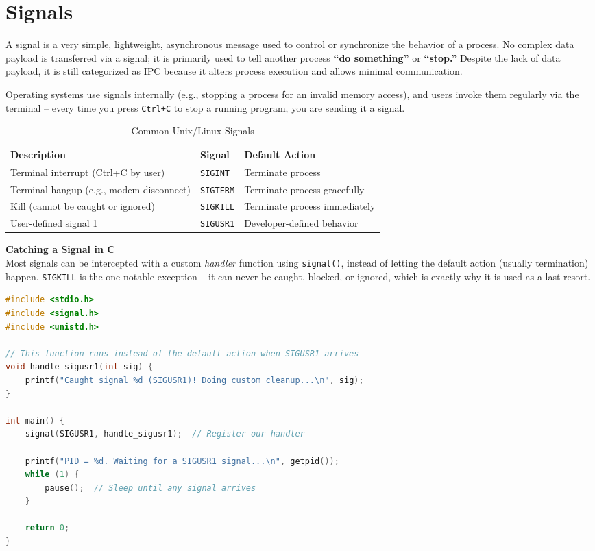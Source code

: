 \section{Signals}
A signal is a very simple, lightweight, asynchronous message used to control or synchronize the behavior of a process. No complex data payload is transferred via a signal; it is primarily used to tell another process \textbf{``do something''} or \textbf{``stop.''} Despite the lack of data payload, it is still categorized as IPC because it alters process execution and allows minimal communication.

Operating systems use signals internally (e.g., stopping a process for an invalid memory access), and users invoke them regularly via the terminal -- every time you press \texttt{Ctrl+C} to stop a running program, you are sending it a signal.

\begin{table}[h!]
\centering
\small
\renewcommand{\arraystretch}{1.4}
\begin{tabular}{|p{6cm}|p{2.5cm}|p{5.5cm}|}
\hline
\textbf{Description} & \textbf{Signal} & \textbf{Default Action} \\ \hline
Terminal interrupt (Ctrl+C by user) & \texttt{SIGINT} & Terminate process \\ \hline
Terminal hangup (e.g., modem disconnect) & \texttt{SIGTERM} & Terminate process gracefully \\ \hline
Kill (cannot be caught or ignored) & \texttt{SIGKILL} & Terminate process immediately \\ \hline
User-defined signal 1 & \texttt{SIGUSR1} & Developer-defined behavior \\ \hline
\end{tabular}
\caption{Common Unix/Linux Signals}
\end{table}

\textbf{Catching a Signal in C}\\
Most signals can be intercepted with a custom \emph{handler} function using \texttt{signal()}, instead of letting the default action (usually termination) happen. \texttt{SIGKILL} is the one notable exception -- it can never be caught, blocked, or ignored, which is exactly why it is used as a last resort.
\begin{lstlisting}[language=C]
#include <stdio.h>
#include <signal.h>
#include <unistd.h>

// This function runs instead of the default action when SIGUSR1 arrives
void handle_sigusr1(int sig) {
    printf("Caught signal %d (SIGUSR1)! Doing custom cleanup...\n", sig);
}

int main() {
    signal(SIGUSR1, handle_sigusr1);  // Register our handler

    printf("PID = %d. Waiting for a SIGUSR1 signal...\n", getpid());
    while (1) {
        pause();  // Sleep until any signal arrives
    }

    return 0;
}
\end{lstlisting}

